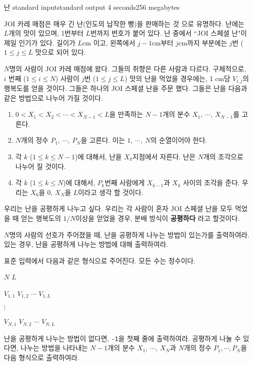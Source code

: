 \begin{problem}{난}
	{standard input}{standard output}
	{4 seconds}{256 megabytes}{}
	
	JOI 카레 매점은 매우 긴 난(인도의 납작한 빵)을 판매하는 것 으로 유명하다. 난에는 $L$개의 맛이 있으며, 1번부터 $L$번까지 번호가 붙어 있다. 난 중에서 ``JOI 스페셜 난"이 제일 인기가 있다. 길이가 $L$cm 이고, 왼쪽에서 $j-1$cm부터 $j$cm까지 부분에는 $j$번 ($1\le j \le L$ 맛으로 되어 있다.
	
	$N$명의 사람이 JOI 카레 매점에 왔다. 그들의 취향은 다른 사람과 다르다. 구체적으로, $i$ 번째 ($1 \le i \le N$) 사람이 $j$번 ($1 \le j \le L$) 맛의 난을 먹었을 경우에는, 1 cm당 $V_{i, j}$의 행복도를 얻을 것이다.
	그들은 하나의 JOI 스페셜 난을 주문 했다. 그들은 난을 다음과 같은 방법으로 나누어 가질 것이다.
	
	\begin{enumerate}
		\item $0 < X_1 < X_2 < \cdots < X_{N-1} < L$을 만족하는 $N-1$개의 분수 $X_1,\ \cdots,\ X_{N-1}$를 고른다.
		\item $N$개의 정수 $P_1,\ \cdots, \ P_N$을 고른다. 이는 $1, \ \cdots, \ N$의 순열이어야 한다.
		\item 각 $k$ ($1 \le k \le N-1$)에 대해서, 난을 $X_k$지점에서 자른다. 난은 $N$개의 조각으로 나누어 질 것이다.
		\item 각 $k$ ($1 \le k \le N$)에 대해서, $P_k$번째 사람에게 $X_{k-1}$과 $X_k$ 사이의 조각을 준다. 우리는 $X_0$을 0, $X_N$을 $L$이라고 생각 할 것이다.
	\end{enumerate}

	우리는 난을 공평하게 나누고 싶다. 우리는 각 사람이 혼자 JOI 스페셜 난을 모두 먹었을 때 얻는 행복도의 $1/N$이상을 얻었을 경우, 분배 방식이 \textbf{공평하다} 라고 할것이다.
	
	$N$명의 사람의 선호가 주어졌을 때, 난을 공평하게 나누는 방법이 있는가를 출력하여라. 있는 경우, 난을 공평하게 나누는 방법에 대해 출력하여라.
	
	\InputFile
	
	표준 입력에서 다음과 같은 형식으로 주어진다. 모든 수는 정수이다.
	
	$N$ $L$
	
	$V_{1,1}$ $V_{1, 2}$ $\cdots$ $V_{1, L}$
	
	$\vdots$
	
	$V_{N,1}$ $V_{N, 2}$ $\cdots$ $V_{N, L}$
	
	\OutputFile
	
	난을 공평하게 나누는 방법이 없다면, \texttt{-1}을 첫째 줄에 출력하여라. 공평하게 나눌 수 있다면, 나누는 방법을 나타내는 $N-1$개의 분수 $X_1,\ \cdots,\ X_N$과 $N$개의 정수 $P_1, \cdots, P_N$을 다음 형식으로 출력하여라.
	

\end{problem}
